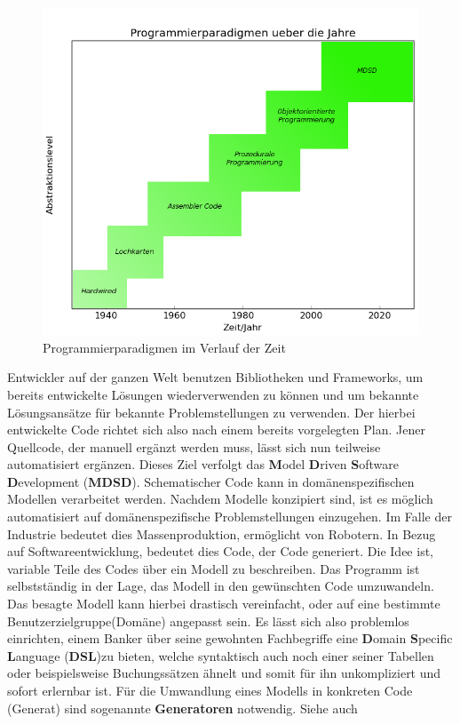 \begin{figure}[h]
	\begin{center}
		\includegraphics[width = \textwidth]{Bilder/paradigmsInTime(matplotlib).png}
		\caption{Programmierparadigmen im Verlauf der Zeit}
		\label{paradigmnsintime}
	\end{center}
\end{figure}Entwickler auf der ganzen Welt benutzen Bibliotheken und Frameworks, um bereits entwickelte Lösungen wiederverwenden zu können und um bekannte Lösungsansätze für bekannte Problemstellungen zu verwenden. Der hierbei entwickelte Code richtet sich also nach einem bereits vorgelegten Plan. Jener Quellcode, der manuell ergänzt werden muss, lässt sich nun teilweise automatisiert ergänzen.  Dieses Ziel verfolgt das \textbf{M}odel \textbf{D}riven \textbf{S}oftware \textbf{D}evelopment (\textbf{MDSD}). Schematischer Code kann in domänenspezifischen Modellen verarbeitet werden. Nachdem Modelle konzipiert sind, ist es möglich automatisiert auf domänenspezifische Problemstellungen einzugehen. Im Falle der Industrie bedeutet dies Massenproduktion, ermöglicht von Robotern. In Bezug auf Softwareentwicklung, bedeutet dies Code, der Code generiert. Die Idee ist, variable Teile des Codes über ein Modell zu beschreiben. Das Programm ist selbstständig in der Lage, das Modell in den gewünschten Code umzuwandeln. Das besagte Modell kann hierbei drastisch vereinfacht, oder auf eine bestimmte Benutzerzielgruppe(Domäne) angepasst sein. Es lässt sich also problemlos einrichten, einem Banker über seine gewohnten Fachbegriffe eine \textbf{D}omain \textbf{S}pecific \textbf{L}anguage (\textbf{DSL})zu bieten, welche syntaktisch auch noch einer seiner Tabellen oder beispielsweise Buchungssätzen ähnelt und somit für ihn unkompliziert und sofort erlernbar ist. Für die Umwandlung eines Modells in konkreten Code (Generat) sind sogenannte \textbf{Generatoren} notwendig. 
\linebreak 
Siehe auch \citet{jorn:MDA}

